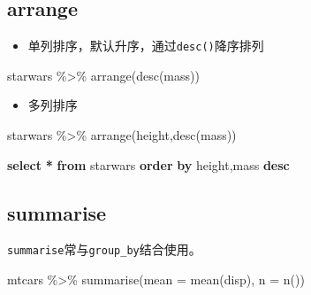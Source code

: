 \documentclass[
]{book}
\newenvironment{Shaded}{\begin{snugshade}}{\end{snugshade}}
\newcommand{\AttributeTok}[1]{\textcolor[rgb]{0.77,0.63,0.00}{#1}}
\newcommand{\FunctionTok}[1]{\textcolor[rgb]{0.00,0.00,0.00}{#1}}
\newcommand{\KeywordTok}[1]{\textcolor[rgb]{0.13,0.29,0.53}{\textbf{#1}}}
\newcommand{\NormalTok}[1]{#1}
\newcommand{\OperatorTok}[1]{\textcolor[rgb]{0.81,0.36,0.00}{\textbf{#1}}}
\newcommand{\SpecialCharTok}[1]{\textcolor[rgb]{0.00,0.00,0.00}{#1}}
\providecommand{\tightlist}{%
  \setlength{\itemsep}{0pt}\setlength{\parskip}{0pt}}
\begin{document}
\hypertarget{arrange}{%
\subsection{arrange}\label{arrange}}

\begin{itemize}
\tightlist
\item
  单列排序，默认升序，通过\texttt{desc()}降序排列
\end{itemize}

\begin{Shaded}
\begin{Highlighting}[]
\NormalTok{starwars }\SpecialCharTok{\%\textgreater{}\%} 
  \FunctionTok{arrange}\NormalTok{(}\FunctionTok{desc}\NormalTok{(mass))}
\end{Highlighting}
\end{Shaded}

\begin{itemize}
\tightlist
\item
  多列排序
\end{itemize}

\begin{Shaded}
\begin{Highlighting}[]
\NormalTok{starwars }\SpecialCharTok{\%\textgreater{}\%} 
  \FunctionTok{arrange}\NormalTok{(height,}\FunctionTok{desc}\NormalTok{(mass))}
\end{Highlighting}
\end{Shaded}

\begin{Shaded}
\begin{Highlighting}[]
\KeywordTok{select} \OperatorTok{*} \KeywordTok{from}\NormalTok{ starwars }\KeywordTok{order} \KeywordTok{by}\NormalTok{ height,mass }\KeywordTok{desc}
\end{Highlighting}
\end{Shaded}

\hypertarget{summarise}{%
\subsection{summarise}\label{summarise}}

\texttt{summarise}常与\texttt{group\_by}结合使用。

\begin{Shaded}
\begin{Highlighting}[]
\NormalTok{mtcars }\SpecialCharTok{\%\textgreater{}\%}
  \FunctionTok{summarise}\NormalTok{(}\AttributeTok{mean =} \FunctionTok{mean}\NormalTok{(disp), }\AttributeTok{n =} \FunctionTok{n}\NormalTok{())}
\end{Highlighting}
\end{Shaded}
\end{document}
